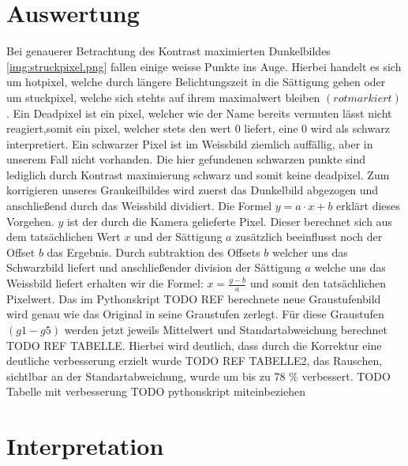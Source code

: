 \section{Auswertung}
Bei genauerer Betrachtung des Kontrast maximierten Dunkelbildes \ref{img:struckpixel.png} fallen einige weisse Punkte ins Auge. Hierbei handelt es sich um hotpixel, welche durch längere Belichtungszeit in die Sättigung gehen oder um stuckpixel, welche sich stehts auf ihrem maximalwert bleiben $(rot markiert)$.
Ein Deadpixel ist ein pixel, welcher wie der Name bereits vermuten lässt nicht reagiert,somit ein pixel, welcher stets den wert 0 liefert, eine 0 wird als schwarz interpretiert. Ein schwarzer Pixel ist im Weissbild ziemlich auffällig, aber in unserem Fall nicht vorhanden. Die hier gefundenen schwarzen punkte sind lediglich durch Kontrast maximierung schwarz und somit keine deadpixel.
Zum korrigieren unseres Graukeilbildes wird zuerst das Dunkelbild abgezogen und anschließend durch das Weissbild dividiert. Die Formel $y = a\cdot x+b$ erklärt dieses Vorgehen. $y$ ist der durch die Kamera gelieferte Pixel. Dieser berechnet sich aus dem tatsächlichen Wert $x$ und der Sättigung $a$ zusätzlich beeinflusst noch der Offset $b$ das Ergebnis. Durch subtraktion des Offsets $b$ welcher uns das Schwarzbild liefert und anschließender division der Sättigung $a$ welche uns das Weissbild liefert erhalten wir die Formel: $x = \frac{y-b}{a}$ und somit den tatsächlichen Pixelwert.
Das im Pythonskript TODO REF berechnete neue Graustufenbild wird genau wie das Original in seine Graustufen zerlegt. Für diese Graustufen $(g1 - g5)$ werden jetzt jeweils Mittelwert und Standartabweichung berechnet TODO REF TABELLE. Hierbei wird deutlich, dass durch die Korrektur eine deutliche verbesserung erzielt wurde TODO REF TABELLE2, das Rauschen, sichtlbar an der Standartabweichung, wurde um bis zu 78 \% verbessert.
TODO Tabelle mit verbesserung
TODO pythonskript miteinbeziehen
\label{chap:VERSUCH_4_AUSWERTUNG}

\section{Interpretation}
\label{chap:VERSUCH_4_INTERPRETATION}